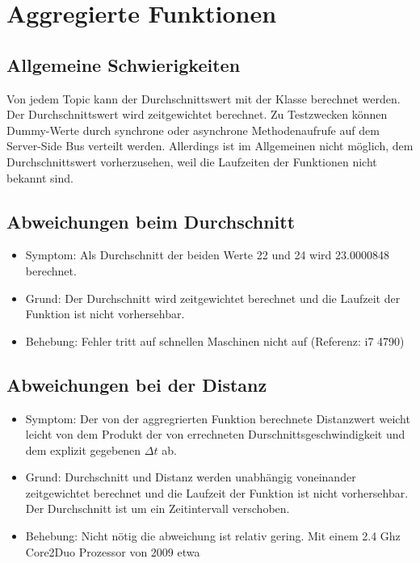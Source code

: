 \documentclass[qualitaetssicherung.tex]{subfiles}
\begin{document}
\section{Aggregierte Funktionen}

	\subsection*{Allgemeine Schwierigkeiten} 
		Von jedem Topic kann der Durchschnittswert mit der Klasse \label{Class: AverageComputation} berechnet werden. Der Durchschnittswert wird zeitgewichtet berechnet. Zu Testzwecken können Dummy-Werte durch synchrone oder asynchrone Methodenaufrufe auf dem Server-Side Bus verteilt werden. Allerdings ist im Allgemeinen nicht möglich, dem Durchschnittswert vorherzusehen, weil die Laufzeiten der Funktionen nicht bekannt sind.


	\subsection{Abweichungen beim Durchschnitt} \label{DAVG}
		\begin{itemize}
			\item
			Symptom: Als Durchschnitt der beiden Werte 22 und 24 wird 23.0000848 berechnet.
			\item
			Grund: Der Durchschnitt wird zeitgewichtet berechnet und die Laufzeit der Funktion ist nicht vorhersehbar.
			\item
			Behebung: Fehler tritt auf schnellen Maschinen nicht auf (Referenz: i7 4790)

		\end{itemize}

	\subsection{Abweichungen bei der Distanz} \label{DDIST}
		\begin{itemize}
			\item
			Symptom: Der von der aggregrierten Funktion  berechnete Distanzwert weicht leicht von dem Produkt der von  errechneten Durschnittsgeschwindigkeit und dem explizit gegebenen $\Delta t$ ab.
			\item
			Grund: Durchschnitt und Distanz werden unabhängig voneinander zeitgewichtet berechnet und die Laufzeit der Funktion ist nicht vorhersehbar. Der Durchschnitt ist um ein Zeitintervall verschoben.
			\item
			Behebung: Nicht nötig die abweichung ist relativ gering. Mit einem 2.4 Ghz Core2Duo Prozessor von 2009 etwa 

		\end{itemize}
\end{document}
